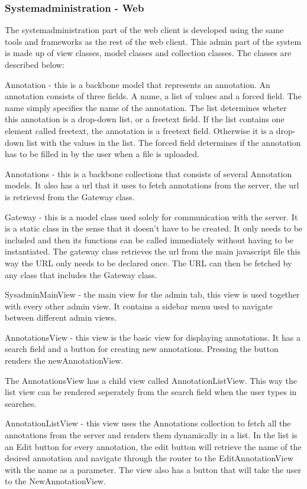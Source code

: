 \subsubsection{Systemadministration - Web}
The systemadministration part of the web client is developed using the same tools and frameworks as the rest of the web client.
This admin part of the system is made up of view classes, model classes and collection classes. The classes are described below:

Annotation - this is a backbone model that represents an annotation. An annotation consists of three fields. A name, a list of values and a forced field. The name simply specifies the name of the annotation. The list determines wheter this annotation is a drop-down list, or a freetext field. If the list contains one element called freetext, the annotation is a freetext field. Otherwise it is a drop-down list with the values in the list. The forced field determines if
the annotation has to be filled in by the user when a file is uploaded.

Annotations - this is a backbone collections that consists of several Annotation models. It also has a url that it uses to fetch annotations from the server, the url is retrieved from the Gateway class. 

Gateway - this is a model class used solely for communication with the server. It is a static class in the sense that it doesn't have to be created. It only needs to be included and then its functions can be called immediately without having to be instantiated. The gateway class retrieves the url from the main javascript file this way the URL only needs to be declared once. The URL can then be fetched by any class that includes the Gateway class.

SysadminMainView - the main view for the admin tab, this view is used together with every other admin view. It contains a sidebar menu used to navigate between different admin views.

AnnotationsView - this view is the basic view for displaying annotations. It has a search field and a button for creating new annotations. Pressing the button renders the newAnnotationView. 

The AnnotationsView has a child view called AnnotationListView. This way the list view can be rendered seperately from the search field when the user types in searches. 

AnnotationListView - this view uses the Annotations collection to fetch all the annotations from the server and renders them dynamically in a list.
In the list is an Edit button for every annotation, the edit button will retrieve the name of the desired annotation and navigate through the router to the EditAnnotationView with the name as a parameter.
The view also has a button that will take the user to the NewAnnotationView.


